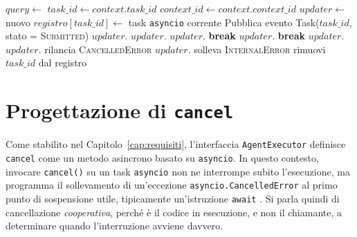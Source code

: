 \begin{algorithm}[htbp]
\caption{Logica di \texttt{execute}}
\label{alg:execute}
\begin{algorithmic}[1]
    \State $query \gets$ 
    \State $task\_id \gets context.task\_id$
    \State $context\_id \gets context.context\_id$
    \State $updater \gets$ nuovo 
    \State $registro[task\_id] \gets$ task \texttt{asyncio} corrente
    \Try
         
            \State Pubblica evento Task($task\_id$, stato = \textsc{Submitted})
        \EndIf
        \State $updater.$
                \State $updater.$
                \State $updater.$
                \State \textbf{break}
                \State $updater.$
                \State \textbf{break}
            \Else
                \State $updater.$
            \EndIf
        \EndFor
        \State $updater.$
        \State rilancia \textsc{CancelledError}
        \State $updater.$
        \State solleva \textsc{InternalError}
    \Finally
        \State rimuovi $task\_id$ dal registro
    \EndTry
\EndFunction
\end{algorithmic}
\end{algorithm}

\FloatBarrier


\section{Progettazione di \texorpdfstring{\texttt{cancel}}{cancel}}
\label{sec:cancel}

Come stabilito nel Capitolo~\ref{cap:requisiti}, l'interfaccia \texttt{AgentExecutor} definisce \texttt{cancel} come un metodo asincrono basato su \texttt{asyncio}. In questo contesto, invocare \texttt{cancel()} su un task \texttt{asyncio} non ne interrompe subito l'esecuzione, ma programma il sollevamento di un'eccezione \texttt{asyncio.CancelledError} al primo punto di sospensione utile, tipicamente un'istruzione \texttt{await} \cite{pythonasynciotask}. Si parla quindi di cancellazione \emph{cooperativa}, perché è il codice in esecuzione, e non il chiamante, a determinare quando l'interruzione avviene davvero.

